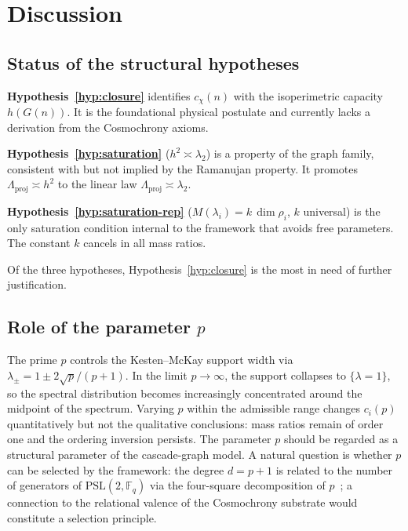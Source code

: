 \section{Discussion}
  \label{sec:discussion}

  \subsection{Status of the structural hypotheses}
    \label{sec:disc:hypotheses}

    \textbf{Hypothesis~\ref{hyp:closure}} identifies $c_\chi(n)$ with the
    isoperimetric capacity $h(G(n))$.
    It is the foundational physical postulate and currently lacks a derivation
    from the Cosmochrony axioms.

    \textbf{Hypothesis~\ref{hyp:saturation}} ($h^2 \asymp \lambda_2$) is a
    property of the graph family, consistent with but not implied by the Ramanujan
    property.
    It promotes $\Lambda_{\mathrm{proj}} \asymp h^2$ to the linear law
    $\Lambda_{\mathrm{proj}} \asymp \lambda_2$.

    \textbf{Hypothesis~\ref{hyp:saturation-rep}} ($M(\lambda_i) = k\,\dim\rho_i$,
    $k$ universal) is the only saturation condition internal to the framework that
    avoids free parameters.
    The constant $k$ cancels in all mass ratios.

    Of the three hypotheses, Hypothesis~\ref{hyp:closure} is the most in need of
    further justification.

  \subsection{Role of the parameter $p$}
    \label{sec:disc:p}

    The prime $p$ controls the Kesten--McKay support width via
    $\lambda_\pm = 1 \pm 2\sqrt{p}/(p+1)$.
    In the limit $p \to \infty$, the support collapses to $\{\lambda = 1\}$, so
    the spectral distribution becomes increasingly concentrated around the
    midpoint of the spectrum.
    Varying $p$ within the admissible range changes $c_i(p)$ quantitatively but
    not the qualitative conclusions: mass ratios remain of order one and the
    ordering inversion persists.
    The parameter $p$ should be regarded as a structural parameter of the
    cascade-graph model.
    A natural question is whether $p$ can be selected by the framework:
    the degree $d = p+1$ is related to the number of generators of
    $\mathrm{PSL}(2,\mathbb{F}_q)$ via the four-square decomposition of
    $p$~\cite{LPS1988}; a connection to the relational valence of the Cosmochrony
    substrate would constitute a selection principle.


